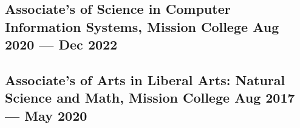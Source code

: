 \documentclass[a4,10pt]{article}
\newenvironment{zitemize}{
\begin{itemize}\itemsep0pt \parskip0pt \parsep1pt}
{\end{itemize}\vspace{-0.5cm}}
\newcommand{\hskills}[1]{
\textbf{\bfseries #1} }
\begin{document}
\subsection*{Associate's of Science in Computer Information Systems, {\normalsize \normalfont Mission College} \hfill Aug 2020 --- Dec 2022} 
\vspace{0.2cm}
\subsection*{Associate's of Arts in Liberal Arts: Natural Science and Math, {\normalsize \normalfont Mission College} \hfill Aug 2017 --- May 2020} 
{\hfill}







\end{document}
